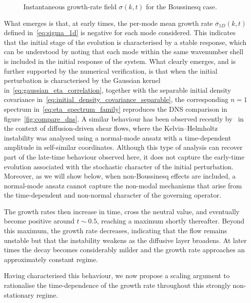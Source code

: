 \begin{figure}[t]
    \centering
    
    \caption{Instantaneous growth-rate field \(\sigma(k,t)\) for the Boussinesq case.}
    \label{fig:BQ_P1_sigma_map}
\end{figure}

What emerges is that, at early times, the per-mode mean growth rate \(\overline{\sigma}_{1D}(k,t)\)
defined in~\eqref{eq:sigma_1d} is negative for each mode considered. This indicates that the
initial stage of the evolution is characterised by a stable response, which can be understood by
noting that each mode within the same wavenumber shell is included in the initial response of the
system. What clearly emerges, and is further supported by the numerical verification, is that when
the initial perturbation is characterised by the Gaussian kernel in~\eqref{eq:gaussian_eta_correlation},
together with the separable initial density covariance in~\eqref{eq:initial_density_covariance_separable},
the corresponding \(n=1\) spectrum in~\eqref{eq:eta_spectrum_family} reproduces the DNS comparison
in figure~\ref{fig:compare_dns}. A similar behaviour has been observed recently
by~\citet{nixon-vieweg-2026} in the context of diffusion-driven shear flows, where the
Kelvin--Helmholtz instability was analysed using a normal-mode ansatz with a time-dependent
amplitude in self-similar coordinates. Although this type of analysis can recover part of the
late-time behaviour observed here, it does not capture the early-time evolution associated with
the stochastic character of the initial perturbation. Moreover, as we will show below, when
non-Boussinesq effects are included, a normal-mode ansatz cannot capture the non-modal mechanisms
that arise from the time-dependent and non-normal character of the governing operator.

The growth rates then increase in time, cross the neutral value, and eventually become positive
around \(t \sim 0.5\), reaching a maximum shortly thereafter. Beyond this maximum, the growth
rate decreases, indicating that the flow remains unstable but that the instability weakens as the
diffusive layer broadens. At later times the decay becomes considerably milder and the growth rate
approaches an approximately constant regime.

Having characterised this behaviour, we now propose a scaling argument to rationalise the
time-dependence of the growth rate throughout this strongly non-stationary regime.

